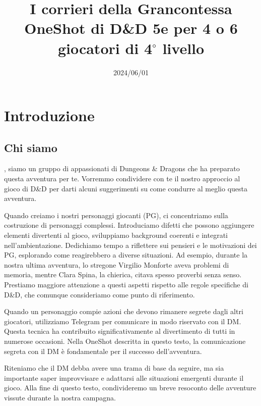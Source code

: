 \documentclass[letterpaper,twocolumn,openany,nodeprecatedcode]{dndbook}
\title{I corrieri della Grancontessa \\
\large OneShot di D\&D 5e per 4 o 6 giocatori di 4$^\circ$ livello}
\author{}
\date{2024/06/01}
\begin{document}
\frontmatter

\maketitle

\tableofcontents


\mainmatter%





\chapter{Introduzione}

\section{Chi siamo}
, siamo un gruppo di appassionati di Dungeons \& Dragons che ha preparato questa avventura per te. Vorremmo condividere con te il nostro approccio al gioco di D\&D per darti alcuni suggerimenti su come condurre al meglio questa avventura.

Quando creiamo i nostri personaggi giocanti (PG), ci concentriamo sulla costruzione di personaggi complessi. Introduciamo difetti che possono aggiungere elementi divertenti al gioco, sviluppiamo background coerenti e integrati nell'ambientazione. Dedichiamo tempo a riflettere sui pensieri e le motivazioni dei PG, esplorando come reagirebbero a diverse situazioni. Ad esempio, durante la nostra ultima avventura, lo stregone Virgilio Monforte aveva problemi di memoria, mentre Clara Spina, la chierica, citava spesso proverbi senza senso. Prestiamo maggiore attenzione a questi aspetti rispetto alle regole specifiche di D\&D, che comunque consideriamo come punto di riferimento.

Quando un personaggio compie azioni che devono rimanere segrete dagli altri giocatori, utilizziamo Telegram per comunicare in modo riservato con il DM. Questa tecnica ha contribuito significativamente al divertimento di tutti in numerose occasioni. Nella OneShot descritta in questo testo, la comunicazione segreta con il DM è fondamentale per il successo dell'avventura.

Riteniamo che il DM debba avere una trama di base da seguire, ma sia importante saper improvvisare e adattarsi alle situazioni emergenti durante il gioco. Alla fine di questo testo, condivideremo un breve resoconto delle avventure vissute durante la nostra campagna.
\end{document}
